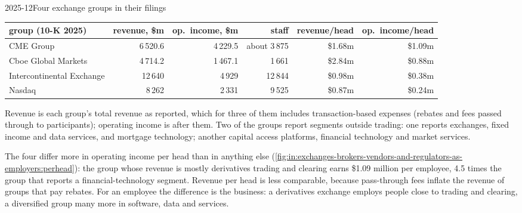 \begin{dated}{2025-12}{Four exchange groups in their filings}\label{dat:in:exchanges-brokers-vendors-and-regulators-as-employers:exchanges}
\footnotesize
\begin{tabular}{@{}lrrrrr@{}}
\toprule
group (10-K 2025) & revenue, \$m & op.\ income, \$m & staff & revenue/head & op.\ income/head\\
\midrule
CME Group & 6\,520.6 & 4\,229.5 & about 3\,875 & \$1.68m & \$1.09m\\
Cboe Global Markets & 4\,714.2 & 1\,467.1 & 1\,661 & \$2.84m & \$0.88m\\
Intercontinental Exchange & 12\,640 & 4\,929 & 12\,844 & \$0.98m & \$0.38m\\
Nasdaq & 8\,262 & 2\,331 & 9\,525 & \$0.87m & \$0.24m\\
\bottomrule
\end{tabular}

\smallskip\noindent Revenue is each group's total revenue as reported, which for three of them includes transaction-based
expenses (rebates and fees passed through to participants); operating income is after them. Two of the groups report segments outside
trading: one reports exchanges, fixed income and data services, and mortgage technology; another capital access
platforms, financial technology and market services.
\end{dated}

The four differ more in operating income per head than in anything else
(\cref{fig:in:exchanges-brokers-vendors-and-regulators-as-employers:perhead}): the group whose revenue is mostly derivatives
trading and clearing earns \$1.09 million per employee, 4.5 times
the group that reports a financial-technology segment.
Revenue per head is less comparable, because pass-through fees inflate the revenue of groups that pay rebates. For an
employee the difference is the business: a derivatives exchange employs people close to trading and clearing, a
diversified group many more in software, data and services.

